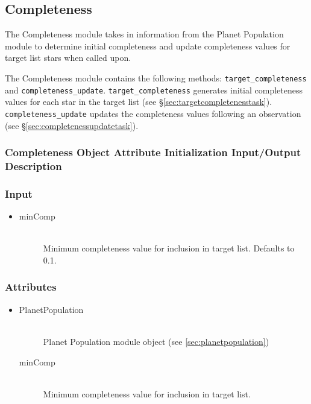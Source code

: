 \documentclass[cleanfoot]{asme2ej}
\begin{document}

\subsection{Completeness}\label{sec:completeness}
The Completeness module takes in information from the Planet Population module to determine initial completeness and update completeness values for target list stars when called upon.

The Completeness module contains the following methods: \verb+target_completeness+ and \verb+completeness_update+. \verb+target_completeness+ generates initial completeness values for each star in the target list (see \S\ref{sec:targetcompletenesstask}). \verb+completeness_update+ updates the completeness values following an observation (see \S\ref{sec:completenessupdatetask}).

\subsubsection{Completeness Object Attribute Initialization Input/Output Description}

\subsubsection*{Input}
\begin{itemize}
    \item 
    \begin{description}
        \item[minComp] \hfill \\
            Minimum completeness value for inclusion in target list.  Defaults to 0.1.
    \end{description}
\end{itemize}

\subsubsection*{Attributes}
\begin{itemize}
    \item 
    \begin{description}
        \item[PlanetPopulation] \hfill \\
        Planet Population module object (see \ref{sec:planetpopulation})
        \item[minComp] \hfill \\
        Minimum completeness value for inclusion in target list. 
    \end{description}
\end{itemize}
\end{document}
